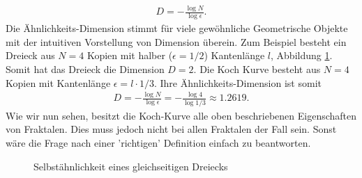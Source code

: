 \begin{align*}
	D = - \frac{\log N}{\log \epsilon }.
\end{align*}
Die Ähnlichkeits-Dimension stimmt für viele gewöhnliche Geometrische Objekte mit der intuitiven Vorstellung von Dimension überein.
Zum Beispiel besteht ein Dreieck aus $N = 4$ Kopien mit halber ($\epsilon = 1/2$) Kantenlänge $l$, Abbildung \ref{ifs:trinagle}.
Somit hat das Dreieck die Dimension $D = 2$.
Die Koch Kurve besteht aus $N = 4$ Kopien mit Kantenlänge $\epsilon =l \cdot 1/3$.
Ihre  Ähnlichkeits-Dimension ist somit
\begin{align*}
	D = - \frac{\log N }{\log \epsilon } = - \frac{\log 4 }{\log 1/3 } \approx 1.2619.
\end{align*}
Wie wir nun sehen, besitzt die Koch-Kurve alle oben beschriebenen Eigenschaften von Fraktalen. 
Dies muss jedoch nicht bei allen Fraktalen der Fall sein. Sonst wäre die Frage nach einer 'richtigen' Definition einfach zu beantworten.
\begin{figure}
	\centering
	\caption{Selbstähnlichkeit eines gleichseitigen Dreiecks}
	\label{ifs:trinagle}
\end{figure}

